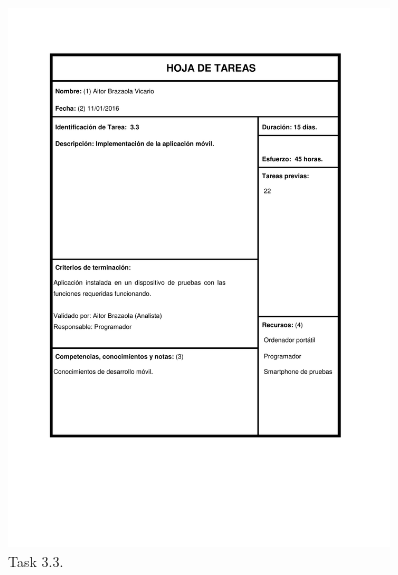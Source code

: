 \documentclass{DeustoFDP}
\begin{document}
\begin{figure}[H]
	\centering
	\includegraphics[width=0.9\textwidth]{fig/Tareas/33}
	\caption{Task 3.3.}
	\label{fig:t33}
\end{figure}
\end{document}
